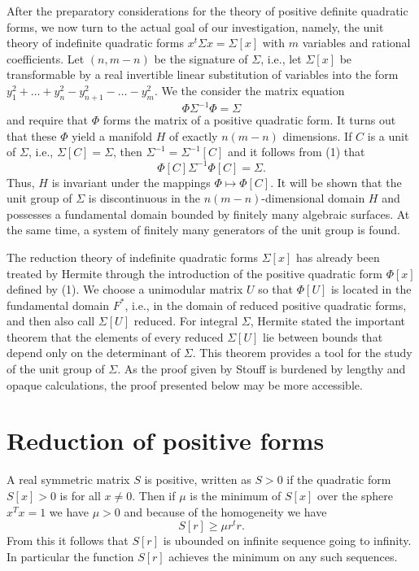 \documentclass[10pt]{amsart}
\begin{document}
After the preparatory considerations for the theory of positive definite quadratic
forms, we now turn to the actual goal of our investigation, namely, the unit theory
of indefinite quadratic forms $x^t\Sigma x = \Sigma[x]$ with $m$ variables and rational
coefficients.
Let $(n, m-n)$ be the signature of $\Sigma$, i.e., let $\Sigma[x]$ be transformable by
a real invertible linear substitution of variables into the form $y_1^2 + \dots + y_n^2 - y_{n+1}^2 - \dots - y_m^2$.
We the consider the matrix equation
\begin{equation*}
\Phi \Sigma^{-1} \Phi = \Sigma
\end{equation*}
and require that $\Phi$ forms the matrix of a positive quadratic form. It turns out that
these $\Phi$ yield a manifold $H$ of exactly $n(m - n)$ dimensions. If $C$ is a unit of $\Sigma$,
i.e., $\Sigma[C] = \Sigma$, then $\Sigma^{-1} = \Sigma^{-1}[C]$ and it follows from (1) that
\begin{equation*}
\Phi[C] \Sigma^{-1} \Phi[C] = \Sigma.
\end{equation*}
Thus, $H$ is invariant under the mappings $\Phi \mapsto \Phi[C]$. It will be shown that
the unit group of $\Sigma$ is discontinuous in the $n(m - n)$-dimensional domain $H$ and
possesses a fundamental domain bounded by finitely many algebraic surfaces. At
the same time, a system of finitely many generators of the unit group is found.

The reduction theory of indefinite quadratic forms $\Sigma[x]$ has already been treated
by Hermite through the introduction of the positive quadratic form $\Phi[x]$ defined by
(1). We choose a unimodular matrix $U$ so that $\Phi[U]$ is located in the fundamental
domain $F^*$, i.e., in the domain of reduced positive quadratic forms, and then also
call $\Sigma[U]$ reduced. For integral $\Sigma$, Hermite stated the important theorem that
the elements of every reduced $\Sigma[U]$ lie between bounds that depend only on the
determinant of $\Sigma$. This theorem provides a tool for the study of the unit group of
$\Sigma$. As the proof given by Stouff is burdened by lengthy and opaque calculations,
the proof presented below may be more accessible.


\section{Reduction of positive forms}

A real symmetric matrix $S$ is positive, written as $S > 0$ if the quadratic form $S[x] > 0$
is for all $x\not= 0$. Then if $\mu$ is the minimum of $S[x]$ over the sphere $x^T x = 1$
we have $\mu > 0$ and because of the homogeneity we have
\begin{equation*}
S[r] \geq \mu r^t r.
\end{equation*}
From this it follows that $S[r]$ is ubounded on infinite sequence going to infinity.
In particular the function $S[r]$ achieves the minimum on any such sequences.
\end{document}
